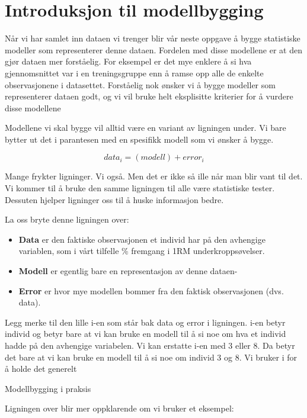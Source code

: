 \documentclass[
]{book}
\begin{document}
\hypertarget{introduksjon-til-modellbygging}{%
\section{Introduksjon til modellbygging}\label{introduksjon-til-modellbygging}}

Når vi har samlet inn dataen vi trenger blir vår neste oppgave å bygge statistiske modeller som representerer denne dataen. Fordelen med disse modellene er at den gjør dataen mer forståelig. For eksempel er det mye enklere å si hva gjennomsnittet var i en treningsgruppe enn å ramse opp alle de enkelte observasjonene i datasettet. Forståelig nok ønsker vi å bygge modeller som representerer dataen godt, og vi vil bruke helt eksplisitte kriterier for å vurdere disse modellene

Modellene vi skal bygge vil alltid være en variant av ligningen under. Vi bare bytter ut det i parantesen med en spesifikk modell som vi ønsker å bygge.

\[
data_i = (modell) + error_i
\]

Mange frykter ligninger. Vi også. Men det er ikke så ille når man blir vant til det. Vi kommer til å bruke den samme ligningen til alle være statistiske tester. Dessuten hjelper ligninger oss til å huske informasjon bedre.

La oss bryte denne ligningen over:

\begin{itemize}
\item
  \textbf{Data} er den faktiske observasjonen et individ har på den avhengige variablen, som i vårt tilfelle \% fremgang i 1RM underkroppsøvelser.
\item
  \textbf{Modell} er egentlig bare en representasjon av denne dataen-
\item
  \textbf{Error} er hvor mye modellen bommer fra den faktisk observasjonen (dvs. data).
\end{itemize}

Legg merke til den lille i-en som står bak data og error i ligningen. i-en betyr individ og betyr bare at vi kan bruke en modell til å si noe om hva et individ hadde på den avhengige variabelen. Vi kan erstatte i-en med 3 eller 8. Da betyr det bare at vi kan bruke en modell til å si noe om individ 3 og 8. Vi bruker i for å holde det generelt

{Modellbygging i praksis}

Ligningen over blir mer oppklarende om vi bruker et eksempel:
\end{document}
